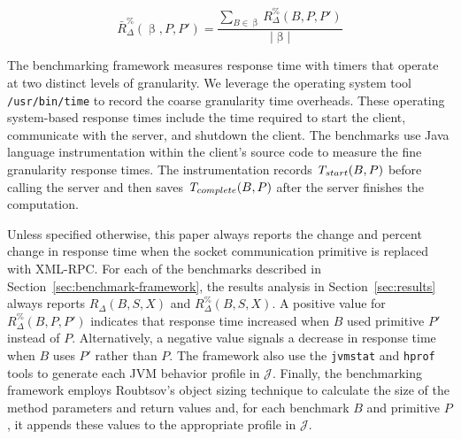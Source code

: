 \documentclass{sig-alternate}
\begin{document}
\vspace*{-.1in}

\begin{equation} \label{eq:time_percent_incr_set}
\bar{R}_\Delta^\%(\upbeta,P,P')  = \frac{\displaystyle \sum_{B\in\upbeta} R_\Delta^\% (B,P,P')}
                          {|\upbeta|} 
\end{equation}

\begin{sloppypar}
The benchmarking framework measures response time with timers that
operate at two distinct levels of granularity.  We leverage the
operating system tool \texttt{/usr/bin/time} to record the coarse
granularity time overheads.  These operating system-based response
times include the time required to start the client, communicate with
the server, and shutdown the client.  The benchmarks use Java language
instrumentation within the client's source code to measure the fine
granularity response times.  The instrumentation records $\mbox{{\em
    T}}_{start}(B,P)$ before calling the server and then saves
$\mbox{{\em T}}_{complete}(B,P)$ after the server finishes the
computation.
\end{sloppypar}


\begin{sloppypar}
Unless specified otherwise, this paper always reports the change and
percent change in response time when the socket communication
primitive is replaced with XML-RPC.  For each of the benchmarks
described in Section~\ref{sec:benchmark-framework}, the results
analysis in Section~\ref{sec:results} always reports $R_\Delta(B,S,X)$
and {\small $R_\Delta^\%(B,S,X)$}.  A positive value for {\small
  $R_\Delta^\%(B,P,P')$} indicates that response time increased when
$B$ used primitive $P'$ instead of $P$.  Alternatively, a negative
value signals a decrease in response time when $B$ uses $P'$ rather
than $P$.  The framework also use the {\tt jvmstat} and {\tt hprof}
tools to generate each JVM behavior profile in $\mathcal{J}$.
Finally, the benchmarking framework employs Roubtsov's object sizing
technique \cite{roubtsov-sizing} to calculate the size of the method
parameters and return values and, for each benchmark $B$ and primitive
$P$, it appends these values to the appropriate profile in
$\mathcal{J}$.
\end{sloppypar}
\end{document}
